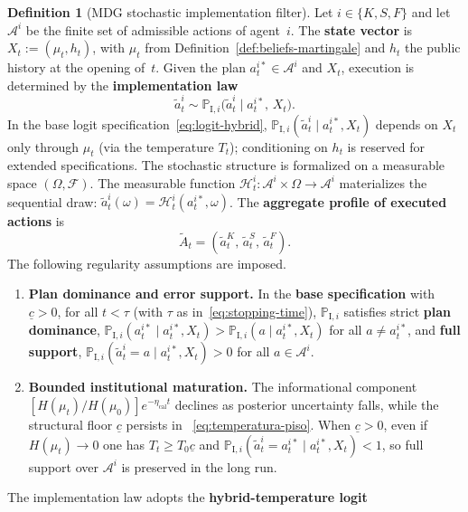 \documentclass[12pt]{article}
\numberwithin{equation}{section}
\numberwithin{table}{section}
\theoremstyle{definition}
\newtheorem{definition}[theorem]{Definition}
\newcommand{\ProbI}[1]{\mathbb{P}_{\mathrm{I},#1}}
\begin{document}
\begin{definition}[MDG stochastic implementation filter]
\label{def:mano-dios-filtro}
Let $i\in\{K,S,F\}$ and let $\mathcal{A}^i$ be the finite set of admissible
actions of agent~$i$. The \textbf{state vector} is
$X_t:=(\mu_t,h_t)$, with $\mu_t$ from
Definition~\ref{def:beliefs-martingale} and $h_t$ the public history at the
opening of~$t$. Given the plan $a_t^{i\ast}\in\mathcal{A}^i$ and $X_t$,
execution is determined by the \textbf{implementation law}
\[
\tilde{a}_t^i \sim \ProbI{i}\bigl(\tilde{a}_t^i \mid a_t^{i\ast},\,X_t\bigr).
\]
In the base logit specification~\eqref{eq:logit-hybrid},
$\ProbI{i}(\tilde{a}_t^i\mid a_t^{i\ast},X_t)$ depends on $X_t$ only through $\mu_t$
(via the temperature $T_t$); conditioning on $h_t$ is reserved for extended
specifications. The stochastic structure is formalized on a measurable space
$(\Omega,\mathcal{F})$. The measurable function
$\mathcal{H}_t^i:\mathcal{A}^i\times\Omega\to\mathcal{A}^i$ materializes the
sequential draw: $\tilde{a}_t^i(\omega)=\mathcal{H}_t^i(a_t^{i\ast},\omega)$.
The \textbf{aggregate profile of executed actions} is
\begin{equation}
\label{eq:tilde-A-t}
\tilde{A}_t = (\tilde{a}_t^K,\,\tilde{a}_t^S,\,\tilde{a}_t^F).
\end{equation}
The following regularity assumptions are imposed.
\begin{enumerate}
  \item[\textup{(i)}] \textbf{Plan dominance and error support.}
  In the \textbf{base specification} with $\underline{c}>0$, for all
  $t<\tau$ (with $\tau$ as in~\eqref{eq:stopping-time}),
  $\ProbI{i}$ satisfies strict \textbf{plan dominance},
  $\ProbI{i}(a_t^{i\ast}\mid a_t^{i\ast},X_t)>\ProbI{i}(a\mid a_t^{i\ast},X_t)$
  for all $a\neq a_t^{i\ast}$, and \textbf{full support},
  $\ProbI{i}(\tilde{a}_t^i=a\mid a_t^{i\ast},X_t)>0$ for all
  $a\in\mathcal{A}^i$.
  \item[\textup{(ii)}] \textbf{Bounded institutional maturation.}
  The informational component
  $[H(\mu_t)/H(\mu_0)]e^{-\eta_{\mathrm{cal}}t}$ declines as posterior
  uncertainty falls, while the structural floor $\underline{c}$ persists in
  ~\eqref{eq:temperatura-piso}. When $\underline{c}>0$, even if
  $H(\mu_t)\to 0$ one has $T_t\ge T_0\underline{c}$ and
  $\ProbI{i}(\tilde{a}_t^i=a_t^{i\ast}\mid a_t^{i\ast},X_t)<1$, so full
  support over $\mathcal{A}^i$ is preserved in the long run.
\end{enumerate}
The implementation law adopts the \textbf{hybrid-temperature logit}

\end{definition}
\end{document}
